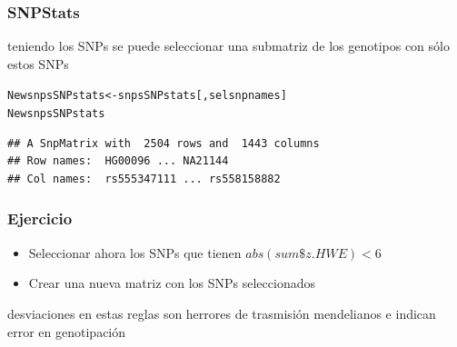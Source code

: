 \documentclass{beamer}\usepackage[]{graphicx}\usepackage[]{color}
\makeatletter
\newcommand{\hlnum}[1]{\textcolor[rgb]{0.686,0.059,0.569}{#1}}%
\newcommand{\hlstr}[1]{\textcolor[rgb]{0.192,0.494,0.8}{#1}}%
\newcommand{\hlopt}[1]{\textcolor[rgb]{0,0,0}{#1}}%
\newcommand{\hlstd}[1]{\textcolor[rgb]{0.345,0.345,0.345}{#1}}%
\newcommand{\hlkwb}[1]{\textcolor[rgb]{0.69,0.353,0.396}{#1}}%
\newcommand{\hlkwc}[1]{\textcolor[rgb]{0.333,0.667,0.333}{#1}}%
\newcommand{\hlkwd}[1]{\textcolor[rgb]{0.737,0.353,0.396}{\textbf{#1}}}%
\newenvironment{kframe}{%
 \def\at@end@of@kframe{}%
 \ifinner\ifhmode%
  \def\at@end@of@kframe{\end{minipage}}%
  \begin{minipage}{\columnwidth}%
 \fi\fi%
 \def\FrameCommand##1{\hskip\@totalleftmargin \hskip-\fboxsep
 \colorbox{shadecolor}{##1}\hskip-\fboxsep
     \hskip-\linewidth \hskip-\@totalleftmargin \hskip\columnwidth}%
 \MakeFramed {\advance\hsize-\width
   \@totalleftmargin\z@ \linewidth\hsize
   \@setminipage}}%
 {\par\unskip\endMakeFramed%
 \at@end@of@kframe}
\newenvironment{knitrout}{}{} %
\makeatother
\begin{document}
\begin{frame}[fragile]
\frametitle{SNPStats}
teniendo los SNPs se puede seleccionar una submatriz de los genotipos con s\'olo estos SNPs
\begin{knitrout}\footnotesize
{}\color{fgcolor}\begin{kframe}
\begin{alltt}
\hlstd{NewsnpsSNPstats}\hlkwb{<-}\hlstd{snpsSNPstats[,selsnpnames]}
\hlstd{NewsnpsSNPstats}
\end{alltt}
\begin{verbatim}
## A SnpMatrix with  2504 rows and  1443 columns
## Row names:  HG00096 ... NA21144 
## Col names:  rs555347111 ... rs558158882
\end{verbatim}
\end{kframe}
\end{knitrout}
\end{frame}


\begin{frame}[fragile]
\frametitle{Ejercicio}

\begin{itemize}
\item Seleccionar ahora los SNPs que tienen $abs(sum\$z.HWE) < 6$
\item Crear una nueva matriz con los SNPs seleccionados
\end{itemize}

desviaciones en estas reglas son herrores de trasmisi\'on mendelianos e indican error en genotipaci\'on
\end{frame}

\end{document}
